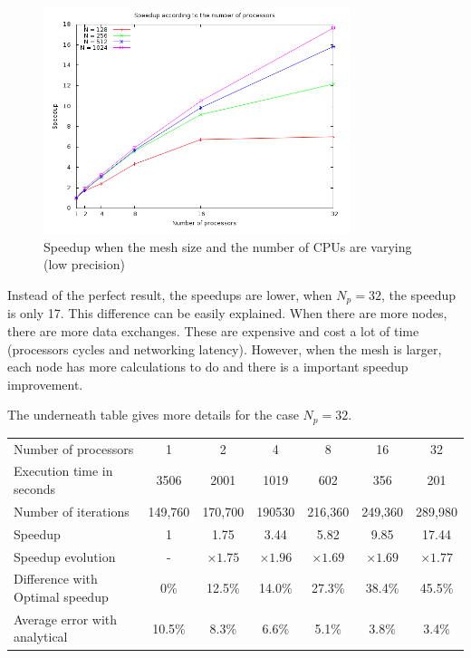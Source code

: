 \documentclass[a4paper,11pt]{article}
\begin{document}
\begin{figure}[h!]
\centering
\includegraphics[width=0.8\textwidth]{./images/lprecision.png}
\caption{Speedup when the mesh size and the number of CPUs are varying (low precision)}
\end{figure}

Instead of the perfect result, the speedups are lower, when $N_p = 32$, the speedup is only 17. This difference can be easily
explained. When there are more nodes, there are more data exchanges. These are expensive and cost
a lot of time (processors cycles and networking latency). However, when the mesh is larger, each node
has more calculations to do and there is a important speedup improvement.

The underneath table gives more details for the case $N_p = 32$.

\vspace{2em}
\hspace{-5em}
\begin{tabular}{l | c | c | c | c | c | c}
Number of processors & 1 & 2 & 4 & 8 & 16 & 32 \\
Execution time in seconds & 3506 & 2001 & 1019 & 602 & 356 & 201 \\
Number of iterations & 149,760 & 170,700 & 190530 & 216,360 & 249,360 & 289,980 \\
Speedup & 1 & 1.75 & 3.44 & 5.82 & 9.85 & 17.44 \\
Speedup evolution & - & $\times1.75$ & $\times1.96$ & $\times1.69$ & $\times1.69$  & $\times1.77$ \\
Difference with Optimal speedup & 0\% & 12.5\% & 14.0\% & 27.3\% & 38.4\% & 45.5\% \\
Average error with analytical & 10.5\% & 8.3\% & 6.6\% & 5.1\% & 3.8\% & 3.4\%
\end{tabular}
\vspace{1em}
\end{document}
